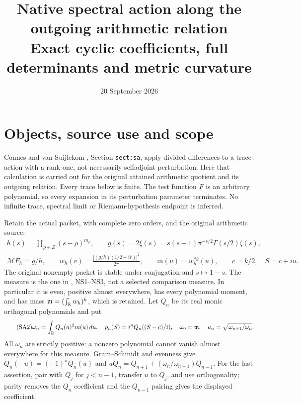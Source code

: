 \documentclass[11pt]{article}
\title{Native spectral action along the outgoing arithmetic relation\\
Exact cyclic coefficients, full determinants and metric curvature}
\author{}\date{20 September 2026}
\begin{document}
\maketitle

\section{Objects, source use and scope}

Connes and van Suijlekom \cite{CV}, Section \texttt{sect:sa},
apply divided differences to a trace action with a rank-one,
not necessarily selfadjoint perturbation. Here that calculation
is carried out for the original attained arithmetic quotient
and its outgoing relation. Every trace below is finite.
The test function $F$ is an arbitrary polynomial, so every
expansion in its perturbation parameter terminates. No
infinite trace, spectral limit or Riemann-hypothesis endpoint
is inferred.

Retain the actual packet, with complete zero orders, and
the original arithmetic source:
\begin{equation}\tag{SA1}\label{SA1}
\begin{gathered}
h(s)=\prod_{\rho\in Z}(s-\rho)^{m_\rho},\qquad
g(s)=2\xi(s)=s(s-1)\pi^{-s/2}\Gamma(s/2)\zeta(s),\\
\mathcal MF_h=g/h,\qquad
w_h(v)=\frac{|(g/h)(1/2+iv)|^2}{2\pi},\qquad
m(u)=w_h^{*k}(u),\qquad c=k/2,\quad S=c+iu.
\end{gathered}
\end{equation}
The original nonempty packet is stable under conjugation
and $s\mapsto1-s$. The measure is the one in \cite{Native},
NS1--NS3, not a selected comparison measure. In particular
it is even, positive almost everywhere, has every polynomial
moment, and has mass
$\mathfrak m=(\int_\mathbb R w_h)^k$, which is retained.
Let $Q_n$ be its real monic orthogonal polynomials and put
\begin{equation}\tag{SA2}\label{SA2}
\omega_n=\int_\mathbb R Q_n(u)^2m(u)\,du,\quad
p_n(S)=i^nQ_n((S-c)/i),\quad
\omega_0=\mathfrak m,\quad
a_n=\sqrt{\omega_{n+1}/\omega_n}.
\end{equation}
All $\omega_n$ are strictly positive: a nonzero polynomial
cannot vanish almost everywhere for this measure.
Gram--Schmidt and evenness give
$Q_n(-u)=(-1)^nQ_n(u)$ and
$uQ_n=Q_{n+1}+(\omega_n/\omega_{n-1})Q_{n-1}$.
For the last assertion, pair with $Q_j$ for $j<n-1$,
transfer $u$ to $Q_j$, and use orthogonality; parity removes
the $Q_n$ coefficient and the $Q_{n-1}$ pairing gives
the displayed coefficient.
\end{document}
